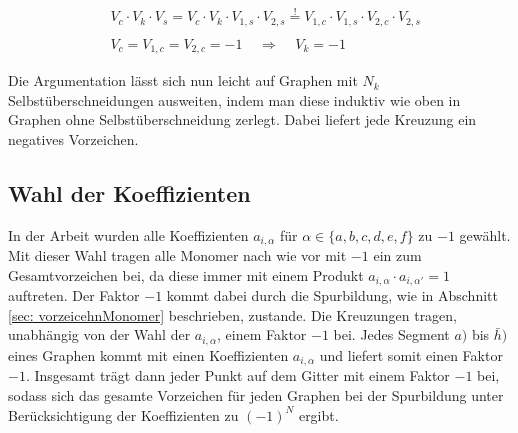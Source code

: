 \begin{equation}
\begin{aligned}
&V_c \cdot V_k \cdot V_s = V_c \cdot V_k \cdot V_{1,s} \cdot V_{2,s}   \overset{!}{=} V_{1,c} \cdot V_{1,s}  \cdot V_{2,c} \cdot V_{2,s} \\
\\
& V_{c} =  V_{1,c} = V_{2,c} = -1  \;\;\;\;\Rightarrow\;\;\;\;   V_k = -1
\end{aligned}
\end{equation}

\noindent Die Argumentation lässt sich nun leicht auf Graphen mit $N_k$ Selbstüberschneidungen ausweiten, indem man diese induktiv wie oben in Graphen ohne Selbstüberschneidung zerlegt. Dabei liefert jede Kreuzung ein negatives Vorzeichen. 

\subsection{Wahl der Koeffizienten}
In der Arbeit wurden alle Koeffizienten $a_{i,\alpha}$ für $\alpha \in \{a,b,c,d,e,f\}$ zu $-1$ gewählt. Mit dieser Wahl tragen alle Monomer nach wie vor mit $-1$ ein zum Gesamtvorzeichen bei, da diese immer mit einem Produkt ${a_{i,\alpha} \cdot a_{i,\alpha'} = 1}$ auftreten. Der Faktor $-1$ kommt dabei durch die Spurbildung, wie in Abschnitt \ref{sec: vorzeicehnMonomer} beschrieben, zustande. Die Kreuzungen tragen, unabhängig von der Wahl der $a_{i,\alpha}$, einem Faktor $-1$ bei. Jedes Segment $a)$ bis $\bar{h})$ eines Graphen kommt mit einen Koeffizienten $a_{i,\alpha}$ und liefert somit einen Faktor $-1$. Insgesamt trägt dann jeder Punkt auf dem Gitter mit einem Faktor $-1$ bei, sodass sich das gesamte Vorzeichen für jeden Graphen bei der Spurbildung unter Berücksichtigung der Koeffizienten zu $(-1)^N$ ergibt.
